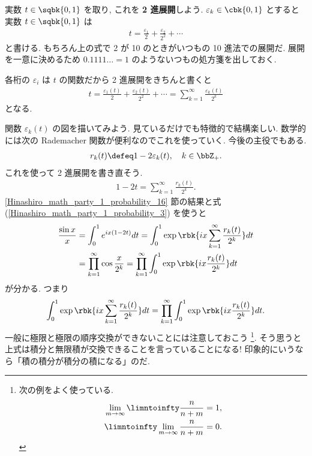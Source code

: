 \documentclass[openany, a4paper, oneside]{jsbook}
\begin{document}
実数 $t \in \sqbk{0, 1}$ を取り, これを \textbf{2 進展開}しよう.
$\varepsilon_k \in \cbk{0, 1}$ とすると実数 $t \in \sqbk{0, 1}$ は
\begin{align}
 t
 =
 \frac{\varepsilon_1}{2} + \frac{\varepsilon_2}{2^2} + \cdots
\end{align}
と書ける.
もちろん上の式で 2 が 10 のときがいつもの 10 進法での展開だ.
展開を一意に決めるため $0.1111 \dots = 1$ のようないつもの処方箋を出しておく.

各桁の $\varepsilon_i$ は $t$ の関数だから 2 進展開をきちんと書くと
\begin{align}
 t
 =
 \frac{\varepsilon_1 (t)}{2} + \frac{\varepsilon_2 (t)}{2^2} + \cdots
 =
 \sum_{k=1}^{\infty} \frac{\varepsilon_k (t)}{2^k}
\end{align}
となる.

関数 $\varepsilon_k (t)$ の図を描いてみよう.
見ているだけでも特徴的で結構楽しい.
数学的には次の Rademacher 関数が便利なのでこれを使っていく.
今後の主役でもある.
\begin{align}
 r_k (t)
 \defeq
 1 - 2 \varepsilon_k (t), \quad k \in \bbZ_+. \label{Hinashiro_math_party_1_probability_4}
\end{align}
これを使って 2 進展開を書き直そう.
\begin{align}
 1 - 2 t
 =
 \sum_{k=1}^{\infty} \frac{r_k (t)}{2^k}. \label{Hinashiro_math_party_1_probability_19}
\end{align}
\ref{Hinashiro_math_party_1_probability_16} 節の結果と式 (\ref{Hinashiro_math_party_1_probability_3}) を使うと
\begin{align}
 \frac{\sin x}{x}
 &=
 \int_{0}^1 e^{ix (1 - 2t)} dt
 =
 \int_{0}^1 \exp \rbk{ix \sum_{k=1}^{\infty} \frac{r_k (t)}{2^k}} dt \\
 &=
 \prod_{k=1}^{\infty} \cos \frac{x}{2^{k}}
 =
 \prod_{k=1}^{\infty} \int_0^1 \exp \rbk{i x \frac{r_k (t)}{2^k}} dt \label{Hinashiro_math_party_1_probability_5}
\end{align}
が分かる.
つまり
\begin{align}
 \int_{0}^1 \exp \rbk{ix \sum_{k=1}^{\infty} \frac{r_k (t)}{2^k}} dt
 =
 \prod_{k=1}^{\infty} \int_0^1 \exp \rbk{i x \frac{r_k (t)}{2^k}} dt.
\end{align}
一般に極限と極限の順序交換ができないことには注意しておこう \footnote{次の例をよく使っている.
\begin{align}
 \lim_{m \to \infty} \limntoinfty \frac{n}{n+m} &= 1, \\
 \limntoinfty \lim_{m \to \infty} \frac{n}{n+m} &= 0.
\end{align}}.
そう思うと上式は積分と無限積が交換できることを言っていることになる!
印象的にいうなら「積の積分が積分の積になる」のだ.
\end{document}
